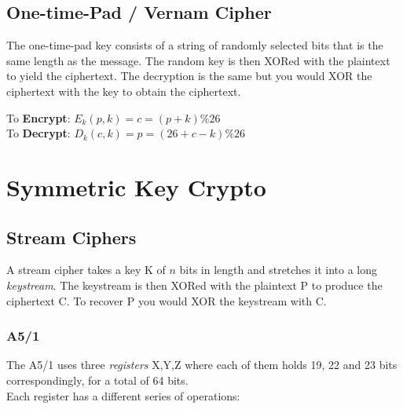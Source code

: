 \documentclass[a4paper]{article}
\begin{document}
\subsection{One-time-Pad / Vernam Cipher}
The one-time-pad key consists of a string of randomly selected bits that is the same length as the message. The random key is then XORed with the plaintext to yield the ciphertext. The decryption is the same but you would XOR the ciphertext with the key to obtain the ciphertext.
\begin{center}
    \justify
    To \textbf{Encrypt}: $E_k(p,k) = c = (p + k) \% 26$\\
    To \textbf{Decrypt}: $D_k(c,k) = p = (26 + c - k) \% 26$
\end{center}

\newpage
\section{Symmetric Key Crypto}

\subsection{Stream Ciphers}
A stream cipher takes a key K of $n$ bits in length and stretches it into a long \textit{keystream}. The keystream is then XORed with the plaintext P to produce the ciphertext C. To recover P you would XOR the keystream with C.

\subsubsection{A5/1}
The A5/1 uses three \textit{registers} X,Y,Z where each of them holds 19, 22 and 23 bits correspondingly, for a total of 64 bits.\\
Each register has a different series of operations:
\end{document}
